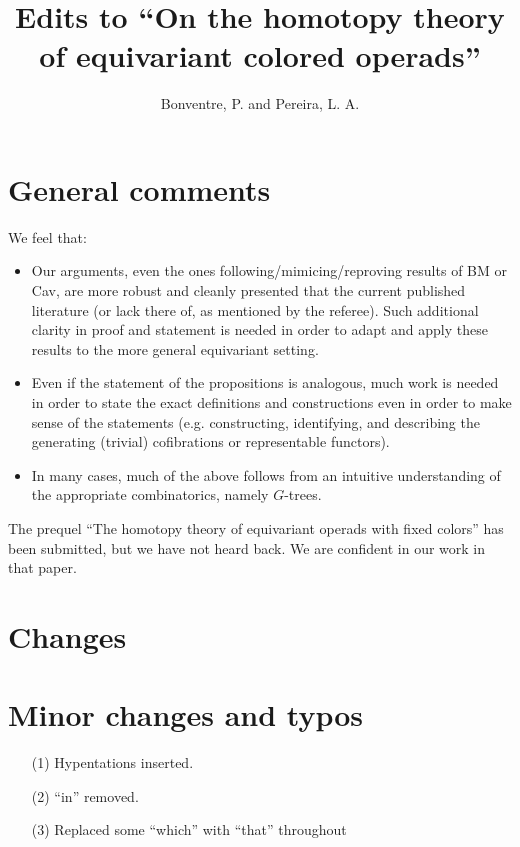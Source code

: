 \documentclass{article}
\begin{document}
 
 
\title{Edits to ``On the homotopy theory of equivariant colored operads''
\\[12pt]} %
 
\author{Bonventre, P. and Pereira, L. A.}
 
\maketitle
 




\section{General comments}

We feel that:
\begin{itemize}
\item Our arguments, even the ones following/mimicing/reproving results of BM or Cav, are more robust and cleanly presented that the current published literature (or lack there of, as mentioned by the referee).
        Such additional clarity in proof and statement is needed in order to adapt and apply these results to the more general equivariant setting.
\item Even if the statement of the propositions is analogous, much work is needed in order to state the exact definitions and constructions even in order to make sense of the statements
        (e.g. constructing, identifying, and describing the generating (trivial) cofibrations or  representable functors).
\item In many cases, much of the above follows from an intuitive understanding of the appropriate combinatorics, namely $G$-trees.
\end{itemize}

The prequel ``The homotopy theory of equivariant operads with fixed colors'' has been submitted, but we have not heard back.
We are confident in our work in that paper.

      

\section{Changes}


\section{Minor changes and typos}
 

\begin{enumerate}
\item[(1)] Hypentations inserted.
\item[(2)] ``in'' removed.
\item[(3)] Replaced some ``which'' with ``that'' throughout
        
\end{enumerate}






{}


\end{document}
